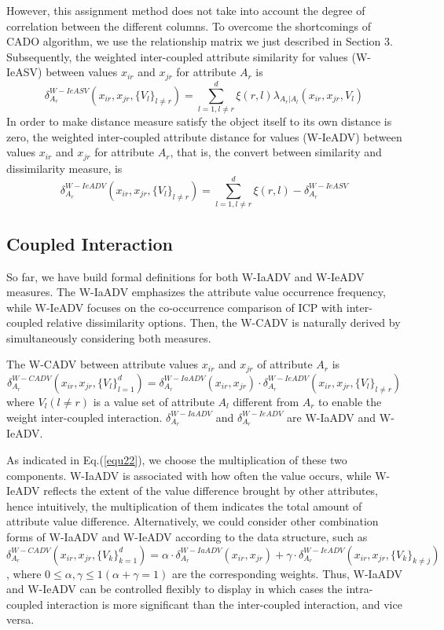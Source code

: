 \documentclass[review]{elsarticle}
\begin{document}
However, this assignment method does not take into account the degree of correlation between the different columns. To overcome the shortcomings of CADO algorithm, we use the relationship matrix we just described in Section 3.
Subsequently, the weighted inter-coupled attribute similarity for values (W-IeASV) between values $x_{ir}$ and $x_{jr}$ for attribute $A_r$ is
\begin{equation}
\delta_{A_r}^{W-IeASV}(x_{ir},x_{jr},\{V_l\}_{l \neq r}) = \sum_{l=1,l \neq r}^{d} \xi(r,l) \lambda_{A_r|A_l}(x_{ir},x_{jr},V_l)
\label{equ20}
\end{equation}
In order to make distance measure satisfy the object itself to its own distance is zero, the weighted inter-coupled attribute distance for values (W-IeADV) between values $x_{ir}$ and $x_{jr}$ for attribute $A_r$, that is, the convert between similarity and dissimilarity measure, is
\begin{equation}
\delta_{A_r}^{W-IeADV}(x_{ir},x_{jr},\{V_l\}_{l \neq r}) = \sum_{l=1,l \neq r}^{d} \xi(r,l) - \delta_{A_r}^{W-IeASV}
\label{equ21}
\end{equation}

\subsection{Coupled Interaction}
So far, we have build formal definitions for both W-IaADV and W-IeADV measures. The W-IaADV emphasizes the attribute value occurrence frequency, while W-IeADV focuses on the co-occurrence comparison of ICP with inter-coupled relative dissimilarity options. Then, the W-CADV is naturally derived by simultaneously considering both measures.

The W-CADV between attribute values $x_{ir}$ and $x_{jr}$ of attribute $A_r$ is
\begin{equation}
\delta_{A_r}^{W-CADV}(x_{ir},x_{jr},\{V_l\}_{l = 1} ^ d) = \delta_{A_r}^{W-IaADV}(x_{ir},x_{jr}) \cdot \delta_{A_r}^{W-IeADV}(x_{ir},x_{jr},\{V_l\}_{l \neq r})
\label{equ22}
\end{equation}
where $V_l (l \neq r)$ is a value set of attribute $A_l$ different from $A_r$ to enable the weight inter-coupled interaction. $\delta_{A_r}^{W-IaADV}$ and $\delta_{A_r}^{W-IeADV}$ are W-IaADV and W-IeADV.

As indicated in Eq.(\ref{equ22}), we choose the multiplication of these two components. W-IaADV is associated with how often the value occurs, while W-IeADV reflects the extent of the value difference brought by other attributes, hence intuitively, the multiplication of them indicates the total amount of attribute value difference. Alternatively, we could consider other combination forms of W-IaADV and W-IeADV according to the data structure, such as $\delta_{A_r}^{W-CADV}(x_{ir},x_{jr},\{V_k\}_{k = 1} ^ d) = \alpha \cdot \delta_{A_r}^{W-IaADV}(x_{ir},x_{jr}) + \gamma \cdot \delta_{A_r}^{W-IeADV}(x_{ir},x_{jr},\{V_k\}_{k \neq j})$, where $0 \leq \alpha,\gamma \leq 1 (\alpha+\gamma = 1)$
are the corresponding weights. Thus, W-IaADV and W-IeADV can be controlled flexibly to display in which cases the intra-coupled interaction is more significant than the inter-coupled interaction, and vice versa.
\end{document}
